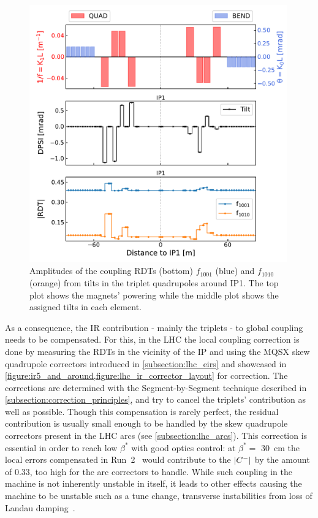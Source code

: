 \begin{figure}[!htb]
    \centering
    \includegraphics*[width=0.99\textwidth]{Figures/IR_Coupling_Correction/triplet_tilts_to_rdts.pdf}
    \caption{Amplitudes of the coupling RDTs (bottom) \(f_{1001}\) (\textcolor{mplblue}{blue}) and \(f_{1010}\) (\textcolor{mplorange}{orange}) from tilts in the triplet quadrupoles around IP\num{1}. The top plot shows the magnets' powering while the middle plot shows the assigned tilts in each element.}
    \label{figure:triplet_tilts_to_rdts}
\end{figure}

As a consequence, the IR contribution - mainly the triplets - to global coupling needs to be compensated.
For this, in the LHC the local coupling correction is done by measuring the RDTs in the vicinity of the IP and using the MQSX skew quadrupole correctors introduced in \cref{subsection:lhc_eirs} and showcased in \cref{figure:ir5_and_around,figure:lhc_ir_corrector_layout} for correction.
The corrections are determined with the Segment-by-Segment technique described in \cref{subsection:correction_principles}, and try to cancel the triplets' contribution as well as possible.
Though this compensation is rarely perfect, the residual contribution is usually small enough to be handled by the skew quadrupole correctors present in the LHC arcs (see \cref{subsection:lhc_arcs}).
This correction is essential in order to reach low \(\beta^{\ast}\) with good optics control: at \(\beta^{*}=\) \qty{30}{\centi\meter} the local errors compensated in Run~\num{2}~\cite{CERN:Persson:LHCOpticsCorrectionsEvian2019} would contribute to the \(\left\lvert C^{-} \right\rvert\) by the amount of \num{0.33}, too high for the arc correctors to handle.
While such coupling in the machine is not inherently unstable in itself, it leads to other effects causing the machine to be unstable such as a tune change, transverse instabilities from loss of Landau damping~\cite{MASTERS:Soubelet:Optics_Octupole_PyHEADTAIL,PRAB:Carver:Transverse_Instabilities_With_Coupling}.

